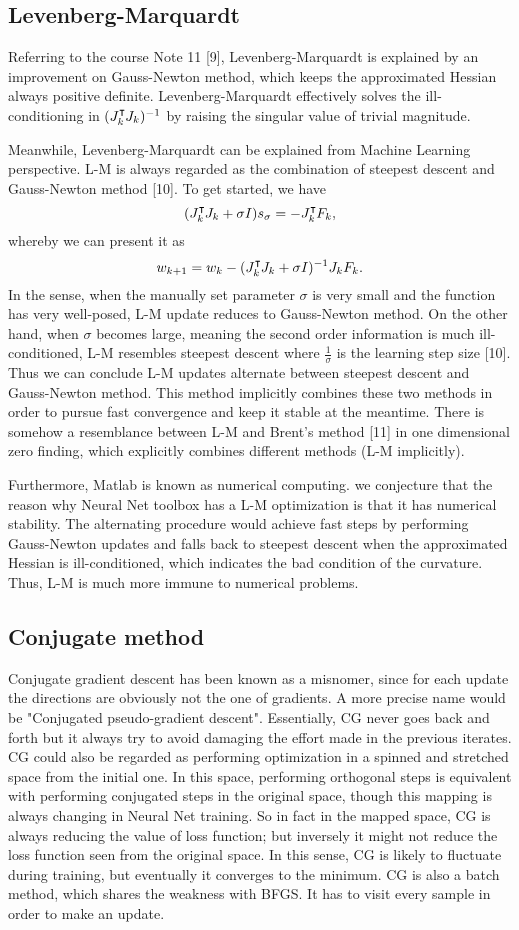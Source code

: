 \documentclass{article} %
\newcommand\transp{^\intercal\kern-\scriptspace}
\begin{document}
\subsection{Levenberg-Marquardt}
Referring to the course Note 11 [9], Levenberg-Marquardt is explained by an improvement on Gauss-Newton method, which keeps the approximated Hessian always positive definite. Levenberg-Marquardt effectively solves the ill-conditioning in $(J_k \transp J_k)^{-1} $ by raising the singular value of trivial magnitude.

Meanwhile, Levenberg-Marquardt can be explained from Machine Learning perspective. L-M is always regarded as the combination of steepest descent and Gauss-Newton method [10]. To get started, we have 
$$
(J_k \transp J_k + \sigma I)s_{\sigma} = -J_k \transp F_k,
$$
whereby we can present it as
$$
w_{k+1} = w_k - (J_k \transp J_k + \sigma I)^{-1}J_k F_k.
$$
In the sense, when the manually set parameter $\sigma$ is very small and the function has very well-posed, L-M update reduces to Gauss-Newton method. On the other hand, when $\sigma$ becomes large, meaning the second order information is much ill-conditioned, L-M resembles steepest descent where $\frac{1}{\sigma}$ is the learning step size [10]. Thus we can conclude L-M updates alternate between steepest descent and Gauss-Newton method. This method implicitly combines these two methods in order to pursue fast convergence and keep it stable at the meantime. There is somehow a resemblance between L-M and Brent's method [11] in one dimensional zero finding, which explicitly combines different methods (L-M implicitly).

Furthermore, Matlab is known as numerical computing. we conjecture that the reason why Neural Net toolbox has a L-M optimization is that it has numerical stability. The alternating procedure would achieve fast steps by performing Gauss-Newton updates and falls back to steepest descent when the approximated Hessian is ill-conditioned, which indicates the bad condition of the curvature. Thus, L-M is much more immune to numerical problems.

\subsection{Conjugate method}
Conjugate gradient descent has been known as a misnomer, since for each update the directions are obviously not the one of gradients. A more precise name would be "Conjugated pseudo-gradient descent". Essentially, CG never goes back and forth but it always try to avoid damaging the effort made in the previous iterates. CG could also be regarded as performing optimization in a spinned and stretched space from the initial one. In this space, performing orthogonal steps is equivalent with performing conjugated steps in the original space, though this mapping is always changing in Neural Net training. So in fact in the mapped space, CG is always reducing the value of loss function; but inversely it might not reduce the loss function seen from the original space. In this sense, CG is likely to fluctuate during training, but eventually it converges to the minimum. CG is also a batch method, which shares the weakness with BFGS. It has to visit every sample in order to make an update.
\end{document}
